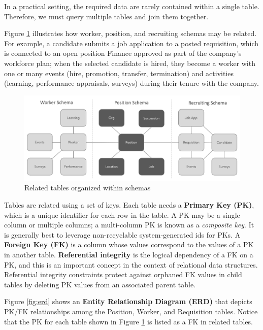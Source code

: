 \documentclass[
]{book}
\begin{document}
In a practical setting, the required data are rarely contained within a single table. Therefore, we must query multiple tables and join them together.

Figure \ref{fig:data-schemas} illustrates how worker, position, and recruiting schemas may be related. For example, a candidate submits a job application to a posted requisition, which is connected to an open position Finance approved as part of the company's workforce plan; when the selected candidate is hired, they become a worker with one or many events (hire, promotion, transfer, termination) and activities (learning, performance appraisals, surveys) during their tenure with the company.

\begin{figure}

{\centering \includegraphics[width=1\linewidth]{graphics/dw_schema} 

}

\caption{Related tables organized within schemas}\label{fig:data-schemas}
\end{figure}

Tables are related using a set of keys. Each table needs a \textbf{Primary Key (PK)}, which is a unique identifier for each row in the table. A PK may be a single column or multiple columns; a multi-column PK is known as a \emph{composite key}. It is generally best to leverage non-recyclable system-generated ids for PKs. A \textbf{Foreign Key (FK)} is a column whose values correspond to the values of a PK in another table. \textbf{Referential integrity} is the logical dependency of a FK on a PK, and this is an important concept in the context of relational data structures. Referential integrity constraints protect against orphaned FK values in child tables by deleting PK values from an associated parent table.

Figure \ref{fig:erd} shows an \textbf{Entity Relationship Diagram (ERD)} that depicts PK/FK relationships among the Position, Worker, and Requisition tables. Notice that the PK for each table shown in Figure \ref{fig:data-schemas} is listed as a FK in related tables.
\end{document}
